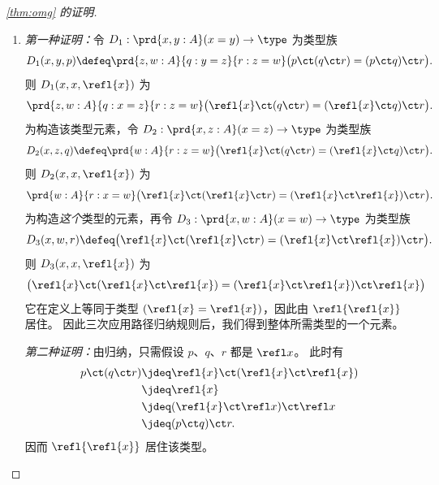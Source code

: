 \begin{proof}[\cref{thm:omg} 的证明]
\begin{enumerate}
    \mentalpause

    \noindent \emph{第二种证明：}由归纳，只需假设 $p$ 是 $\refl x$。
    在此情形下，$\opp{(\opp{p})}\jdeq \opp{(\opp{\refl x})} \jdeq \refl x$。

  \item \emph{第一种证明：}令 $D_1:\prd{x,y:A} (x=y) \to \type$ 为类型族
    \begin{equation*}
      D_1(x,y,p)\defeq\prd{z,w:A}{q:y= z}{r:z= w} \big(p\ct (q\ct r)=  (p\ct q)\ct r\big).
    \end{equation*}
    则 $D_1(x,x,\refl{x})$ 为
    \begin{equation*}
      \prd{z,w:A}{q:x= z}{r:z= w} \big(\refl{x}\ct(q\ct r)= (\refl{x}\ct q)\ct r\big).
    \end{equation*}
    为构造该类型元素，令 $D_2:\prd{x,z:A} (x=z) \to \type$ 为类型族
    \begin{equation*}
      D_2 (x,z,q) \defeq \prd{w:A}{r:z=w} \big(\refl{x}\ct(q\ct r)= (\refl{x}\ct q)\ct r\big).
    \end{equation*}
    则 $D_2(x,x,\refl{x})$ 为
    \begin{equation*}
      \prd{w:A}{r:x=w} \big(\refl{x}\ct(\refl{x}\ct r)= (\refl{x}\ct \refl{x})\ct r\big).
    \end{equation*}
    为构造\emph{这个}类型的元素，再令 $D_3:\prd{x,w:A} (x=w) \to \type$ 为类型族
    \begin{equation*}
      D_3(x,w,r) \defeq \big(\refl{x}\ct(\refl{x}\ct r)= (\refl{x}\ct \refl{x})\ct r\big).
    \end{equation*}
    则 $D_3(x,x,\refl{x})$ 为
    \begin{equation*}
      \big(\refl{x}\ct(\refl{x}\ct \refl{x})= (\refl{x}\ct \refl{x})\ct \refl{x}\big)
    \end{equation*}
    它在定义上等同于类型 $(\refl{x} = \refl{x})$，因此由 $\refl{\refl{x}}$ 居住。
    因此三次应用路径归纳规则后，我们得到整体所需类型的一个元素。

    \mentalpause

    \noindent \emph{第二种证明：}由归纳，只需假设 $p$、$q$、$r$ 都是 $\refl x$。
    此时有
    \begin{align*}
      p\ct (q\ct r)
      &\jdeq \refl{x}\ct(\refl{x}\ct \refl{x})\\
      &\jdeq \refl{x}\\
      &\jdeq (\refl{x}\ct \refl x)\ct \refl x\\
      &\jdeq (p\ct q)\ct r.
    \end{align*}
    因而 $\refl{\refl{x}}$ 居住该类型。 \qedhere
  \end{enumerate}
\end{proof}


